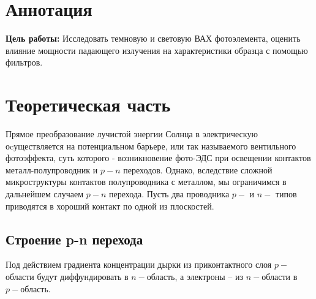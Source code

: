 \documentclass[a4paper, 12pt]{article}
\begin{document}
\newpage
\tableofcontents

\newpage
\section{Аннотация}
\textbf{Цель работы:}
Исследовать темновую и световую ВАХ фотоэлемента, оценить влияние мощности падающего излучения на характеристики образца с помощью фильтров. 
    
 \section{Теоретическая часть} 
 
Прямое преобразование лучистой энергии Солнца в электрическую оcуществляется на потенциальном барьере, или так называемого вентильного фотоэффекта, суть которого - возникновение фото-ЭДС при освещении контактов металл-полупроводник и $p-n$ переходов. Однако, вследствие сложной микроструктуры контактов полупроводника с металлом, мы ограничимся в дальнейшем случаем $p-n$ перехода. 
Пусть два проводника $p-$ и $n-$ типов приводятся в хороший контакт по одной из плоскостей.
\subsection{Строение p-n перехода} 

Под действием градиента концентрации дырки из приконтактного 
слоя $p-$области будут диффундировать в $n-$область, а электроны – из $n-$области в $p-$область. 
\end{document}

